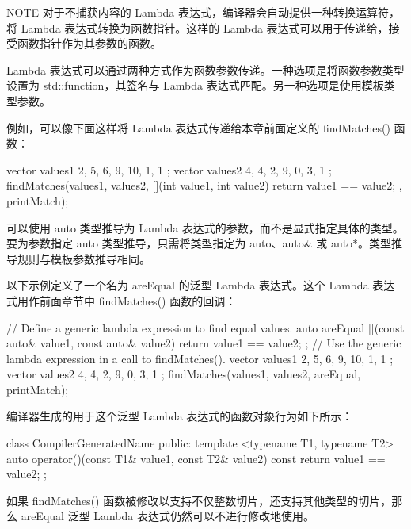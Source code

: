 \begin{myNotic}{NOTE}
对于不捕获内容的 Lambda 表达式，编译器会自动提供一种转换运算符，将 Lambda 表达式转换为函数指针。这样的 Lambda 表达式可以用于传递给，接受函数指针作为其参数的函数。
\end{myNotic}


Lambda 表达式可以通过两种方式作为函数参数传递。一种选项是将函数参数类型设置为 std::function，其签名与 Lambda 表达式匹配。另一种选项是使用模板类型参数。

例如，可以像下面这样将 Lambda 表达式传递给本章前面定义的 findMatches() 函数：

\begin{cpp}
vector values1 { 2, 5, 6, 9, 10, 1, 1 };
vector values2 { 4, 4, 2, 9, 0, 3, 1 };
findMatches(values1, values2,
    [](int value1, int value2) { return value1 == value2; },
    printMatch);
\end{cpp}


可以使用 auto 类型推导为 Lambda 表达式的参数，而不是显式指定具体的类型。要为参数指定 auto 类型推导，只需将类型指定为 auto、auto\& 或 auto*。类型推导规则与模板参数推导相同。

以下示例定义了一个名为 areEqual 的泛型 Lambda 表达式。这个 Lambda 表达式用作前面章节中 findMatches() 函数的回调：

\begin{cpp}
// Define a generic lambda expression to find equal values.
auto areEqual { [](const auto& value1, const auto& value2) {
        return value1 == value2; } };
// Use the generic lambda expression in a call to findMatches().
vector values1 { 2, 5, 6, 9, 10, 1, 1 };
vector values2 { 4, 4, 2, 9, 0, 3, 1 };
findMatches(values1, values2, areEqual, printMatch);
\end{cpp}

编译器生成的用于这个泛型 Lambda 表达式的函数对象行为如下所示：

\begin{cpp}
class CompilerGeneratedName
{
    public:
        template <typename T1, typename T2>
        auto operator()(const T1& value1, const T2& value2) const {
            return value1 == value2; }
};
\end{cpp}

如果 findMatches() 函数被修改以支持不仅整数切片，还支持其他类型的切片，那么 areEqual 泛型 Lambda 表达式仍然可以不进行修改地使用。

